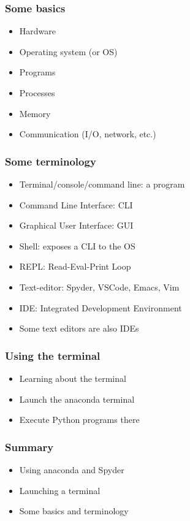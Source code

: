 \documentclass[14pt,compress]{beamer}
\begin{document}
\begin{frame}[plain]
  \frametitle{Some basics}
  \begin{itemize}
  \item Hardware
  \item Operating system (or OS)
  \item Programs
  \item Processes
  \item Memory
  \item Communication (I/O, network, etc.)
  \end{itemize}
\end{frame}

\begin{frame}[plain]
  \frametitle{Some terminology}
  \begin{itemize}
  \item Terminal/console/command line: a program
    \vspace*{0.2in}
  \item Command Line Interface: CLI
  \item Graphical User Interface: GUI
    \vspace*{0.2in}
  \item Shell: exposes a CLI to the OS
  \item REPL: Read-Eval-Print Loop
    \vspace*{0.2in}
  \item Text-editor: Spyder, VSCode, Emacs, Vim
  \item IDE: Integrated Development Environment
  \item Some text editors are also IDEs
  \end{itemize}
\end{frame}


\begin{frame}[plain]
  \frametitle{Using the terminal}
  \begin{itemize}
  \item Learning about the terminal
  \item Launch the anaconda terminal
  \item Execute Python programs there
  \end{itemize}
\end{frame}

\begin{frame}[plain]
  \frametitle{Summary}
  \begin{itemize}
  \item Using anaconda and Spyder
  \item Launching a terminal
  \item Some basics and terminology
  \end{itemize}
\end{frame}
\end{document}
